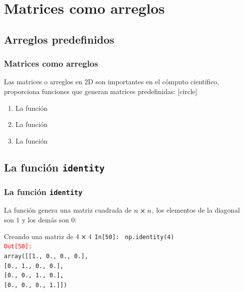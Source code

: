 \section{Matrices como arreglos}
\subsection{Arreglos predefinidos}
\begin{frame}
\frametitle{Matrices como arreglos}
Las matrices o arreglos en 2D son importantes en el cómputo científico,  proporciona funciones que generan matrices predefinidas:
\pause
{}
[circle]
\begin{enumerate}[<+->]
\item La función 
\item La función 
\item La función 
\end{enumerate}
\end{frame}
\subsection{La función \texttt{identity}}
\begin{frame}[fragile]
\frametitle{La función \texttt{identity}}
La función  genera una matriz cuadrada de $n \cp n$, los elementos de la diagonal son $1$ y los demás son $0$:
\fontsize{12}{12}\selectfont
\begin{exampleblock}{Creando una matriz de $4 \cp 4$}
\textcolor{ao}{\texttt{In[50]: }} \texttt{np.identity(4)} \\
\medskip
\pause
\textcolor{red}{\texttt{Out[50]: }} \\
\texttt{array([[1., 0., 0., 0.],} \\
\texttt{[0., 1., 0., 0.],} \\
\texttt{[0., 0., 1., 0.],} \\
\texttt{[0., 0., 0., 1.]])}
\end{exampleblock}
\end{frame}
